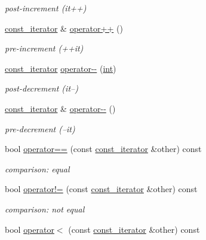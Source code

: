 \begin{DoxyCompactItemize}
\begin{DoxyCompactList}\small\item\em post-\/increment (it++) \end{DoxyCompactList}\item 
\hyperlink{classnlohmann_1_1basic__json_1_1const__iterator}{const\+\_\+iterator} \& \hyperlink{classnlohmann_1_1basic__json_1_1const__iterator_a8fbb15efd97599209a7def77af8e748e}{operator++} ()
\begin{DoxyCompactList}\small\item\em pre-\/increment (++it) \end{DoxyCompactList}\item 
\hyperlink{classnlohmann_1_1basic__json_1_1const__iterator}{const\+\_\+iterator} \hyperlink{classnlohmann_1_1basic__json_1_1const__iterator_a6cab1c2ed7e2a014980e2a5717f43a64}{operator-\/-\/} (\hyperlink{tk_8h_a83f82f76e7fed06f4c49d2db94028a6d}{int})
\begin{DoxyCompactList}\small\item\em post-\/decrement (it--) \end{DoxyCompactList}\item 
\hyperlink{classnlohmann_1_1basic__json_1_1const__iterator}{const\+\_\+iterator} \& \hyperlink{classnlohmann_1_1basic__json_1_1const__iterator_adeb2ff3fdf3cc301b72db109934c9199}{operator-\/-\/} ()
\begin{DoxyCompactList}\small\item\em pre-\/decrement (--it) \end{DoxyCompactList}\item 
bool \hyperlink{classnlohmann_1_1basic__json_1_1const__iterator_ab4c0b9baaec9ebc4837158e272f6c803}{operator==} (const \hyperlink{classnlohmann_1_1basic__json_1_1const__iterator}{const\+\_\+iterator} \&other) const 
\begin{DoxyCompactList}\small\item\em comparison\+: equal \end{DoxyCompactList}\item 
bool \hyperlink{classnlohmann_1_1basic__json_1_1const__iterator_a9e4c6e48e3c2f3ff357ef8215b8c8fca}{operator!=} (const \hyperlink{classnlohmann_1_1basic__json_1_1const__iterator}{const\+\_\+iterator} \&other) const 
\begin{DoxyCompactList}\small\item\em comparison\+: not equal \end{DoxyCompactList}\item 
bool \hyperlink{classnlohmann_1_1basic__json_1_1const__iterator_a65f491b515e5967e9c0b40289e3c0ff3}{operator$<$} (const \hyperlink{classnlohmann_1_1basic__json_1_1const__iterator}{const\+\_\+iterator} \&other) const 

\end{DoxyCompactItemize}
